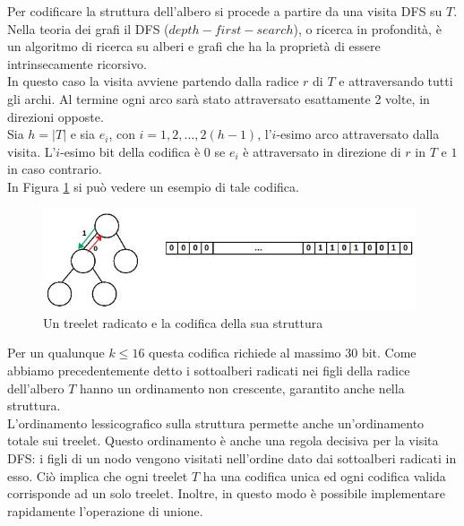 Per codificare la struttura dell'albero si procede a partire da una visita DFS su $ T $.
Nella teoria dei grafi il DFS ($ depth-first-search $), o ricerca in profondit\`a, \`e un algoritmo di ricerca su alberi e grafi che ha la propriet\`a di essere intrinsecamente ricorsivo. \\
In questo caso la visita avviene partendo dalla radice $ r $ di $ T $ e attraversando tutti gli archi. Al termine ogni arco sar\`a stato attraversato esattamente 2 volte, in direzioni opposte. \\
Sia $h=|T|$ e sia $e_i$, con $i = 1, 2, \dots, 2(h-1)$, l'$i$-esimo arco attraversato dalla visita. 
L'$i$-esimo bit della codifica \`e $0$ se $e_i$ \`e attraversato in direzione di $r$ in $T$ e $1$ in caso contrario.\\
 In Figura \ref{figura} si pu\`o vedere un esempio di tale codifica.

\begin{figure}[htbp]
	\centering
	\includegraphics[width=11cm]{capitolo2/grafo3}
	\caption{Un treelet radicato e la codifica della sua struttura}
	\label{figura}
\end{figure}

Per un qualunque $ k \le 16 $ questa codifica richiede al massimo 30 bit.
Come abbiamo precedentemente detto i sottoalberi radicati nei figli della radice dell'albero $ T $ hanno un ordinamento non crescente, garantito anche nella struttura.\\
L'ordinamento lessicografico sulla struttura permette anche un'ordinamento totale sui treelet. Questo ordinamento \`e anche una regola decisiva per la visita DFS: i figli di un nodo vengono visitati nell'ordine dato dai sottoalberi radicati in esso.
Ci\`o implica che ogni treelet $ T $ ha una codifica unica ed ogni codifica valida corrisponde ad un solo treelet. Inoltre, in questo modo \`e possibile implementare rapidamente l'operazione di unione.\\

